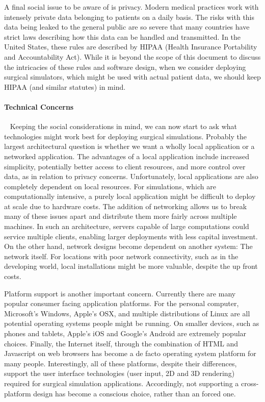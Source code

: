 A final social issue to be aware of is privacy. Modern medical
practices work with intensely private data belonging to patients on a
daily basis. The risks with this data being leaked to the general
public are so severe that many countries have strict laws describing
how this data can be handled and transmitted. In the United States,
these rules are described by HIPAA (Health Insurance Portability and
Accountability Act). While it is beyond the scope of this document to
discuss the intricacies of these rules and software design, when we
consider deploying surgical simulators, which might be used with
actual patient data, we should keep HIPAA (and similar statutes) in mind.

\paragraph{Technical Concerns}~ Keeping the social considerations
in mind, we can now start to ask what technologies might work best for
deploying surgical simulations. Probably the largest architectural
question is whether we want a wholly local application or a networked
application. The advantages of a local application include increased
simplicity, potentially better access to client resources, and more
control over data, as in relation to privacy concerns. Unfortunately,
local applications are also completely dependent on local
resources. For simulations, which are computationally intensive, a
purely local application might be difficult to deploy at scale due to
hardware costs. The addition of networking allows us to break many of
these issues apart and distribute them more fairly across multiple
machines. In such an architecture, servers capable of large
computations could service multiple clients, enabling larger
deployments with less capital investment. On the other hand, network
designs become dependent on another system: The network itself. For
locations with poor network connectivity, such as in the developing
world, local installations might be more valuable, despite the up
front costs.

Platform support is another important concern. Currently there are
many popular consumer facing application platforms. For the personal
computer, Microsoft's Windows, Apple's OSX, and multiple distributions
of Linux are all potential operating systems people might be
running. On smaller devices, such as phones and tablets, Apple's iOS
and Google's Android are extremely popular choices. Finally, the
Internet itself, through the combination of HTML and Javascript on web
browsers has become a de facto operating system platform for many
people. Interestingly, all of these platforms, despite their
differences, support the user interface technologies (user input, 2D
and 3D rendering) required for surgical simulation
applications. Accordingly, not supporting a cross-platform design
has become a conscious choice, rather than an forced one.

